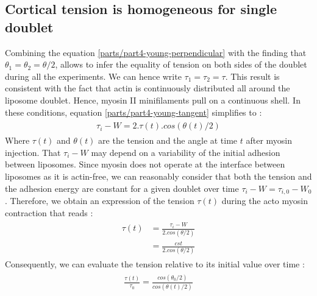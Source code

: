 \documentclass[A4paperpaper,11pt,english]{sphinxmanual}
\begin{document}
\subsection{Cortical tension is homogeneous for single doublet}
\label{parts/part4:cortical-tension-is-homogeneous-for-single-doublet}
Combining the equation \eqref{parts/part4-young-perpendicular} with the finding that \(\theta_1 = \theta_2 = \theta
/2\), allows to infer the equality of tension on both sides of the doublet during all the
experiments. We can hence write \(\tau_1 = \tau_2 = \tau\). This result is
consistent with the fact that actin is continuously distributed all around the
liposome doublet. Hence, myosin II minifilaments pull on a continuous shell. In
these conditions, equation \eqref{parts/part4-young-tangent} simplifies to :
\label{parts/part4:equation-eq3}\begin{gather}
\begin{split}\tau_i - W = 2.\tau(t).cos(\theta(t)/2)\end{split}\label{parts/part4-eq3}
\end{gather}
Where \(\tau(t)\) and \(\theta(t)\) are the tension and the angle at
time \(t\)  after myosin injection. That
\(\tau_i-W\) may depend on a variability of the initial adhesion between
liposomes. Since myosin does not operate at the interface between liposomes as
it is actin-free, we can reasonably consider that both the tension and
the adhesion energy are constant for a given doublet over time
\(\tau_i-W = \tau_{i,0}-W_0\).
Therefore, we obtain an expression of the tension \(\tau(t)\) during the acto myosin contraction that reads :
\label{parts/part4:equation-eqtime}\begin{gather}
\begin{split}\tau(t) &= \frac{ \tau_i - W }{2.cos(\theta/2)}\\
        &= \frac{ cst           }{2.cos(\theta/2)}\end{split}\label{parts/part4-eqtime}
\end{gather}
Consequently, we can evaluate the tension relative to its initial value over time :
\label{parts/part4:equation-eqa402a}\begin{gather}
\begin{split}\frac{ \tau(t) }{\tau_0} = \frac{cos(\theta_0/2)}{cos(\theta(t)/2)}\end{split}\label{parts/part4-eqa402a}
\end{gather}
\end{document}
